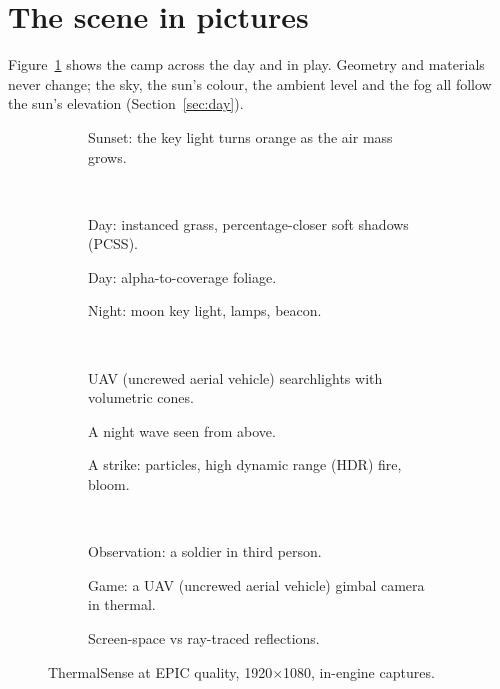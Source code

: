 \section{The scene in pictures}
\label{sec:pictures}
Figure~\ref{fig:hero} shows the camp across the day and in play. Geometry and materials never change; the sky, the
sun's colour, the ambient level and the fog all follow the sun's elevation (Section~\ref{sec:day}).

\begin{figure}[p]
\centering
\begin{subfigure}[t]{\linewidth}\caption{Sunset: the key light turns orange as the air mass grows.}\end{subfigure}\\[1.5mm]
\begin{subfigure}[t]{0.325\linewidth}\caption{Day: instanced grass, percentage-closer soft shadows (PCSS).}\end{subfigure}\hfill
\begin{subfigure}[t]{0.325\linewidth}\caption{Day: alpha-to-coverage foliage.}\end{subfigure}\hfill
\begin{subfigure}[t]{0.325\linewidth}\caption{Night: moon key light, lamps, beacon.}\end{subfigure}\\[1.5mm]
\begin{subfigure}[t]{0.325\linewidth}\caption{UAV (uncrewed aerial vehicle) searchlights with volumetric cones.}\end{subfigure}\hfill
\begin{subfigure}[t]{0.325\linewidth}\caption{A night wave seen from above.}\end{subfigure}\hfill
\begin{subfigure}[t]{0.325\linewidth}\caption{A strike: particles, high dynamic range (HDR) fire, bloom.}\end{subfigure}\\[1.5mm]
\begin{subfigure}[t]{0.325\linewidth}\caption{Observation: a soldier in third person.}\end{subfigure}\hfill
\begin{subfigure}[t]{0.325\linewidth}\caption{Game: a UAV (uncrewed aerial vehicle) gimbal camera in thermal.}\end{subfigure}\hfill
\begin{subfigure}[t]{0.325\linewidth}\caption{Screen-space vs ray-traced reflections.}\end{subfigure}
\caption{ThermalSense at EPIC quality, 1920$\times$1080, in-engine captures.}
\label{fig:hero}
\end{figure}

